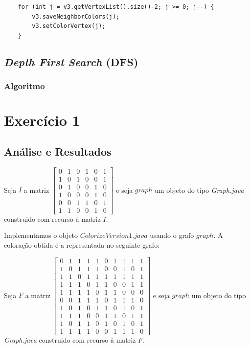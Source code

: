 \documentclass[a4paper,12pt]{report}
\begin{document}
\begin{lstlisting}
    for (int j = v3.getVertexList().size()-2; j >= 0; j--) {
        v3.saveNeighborColors(j);
        v3.setColorVertex(j);
    }
\end{lstlisting}

\section{\textit{Depth First Search} (DFS)}

\subsection{Algoritmo}

\chapter{Exercício 1}

\section{Análise e Resultados}

Seja $I$ a matriz 
$\begin{bmatrix}
    0&1&0&1&0&1\\
    1&0&1&0&0&1\\
    0&1&0&0&1&0\\
    1&0&0&0&1&0\\
    0&0&1&1&0&1\\
    1&1&0&0&1&0
\end{bmatrix}$ e seja $graph$ um objeto do tipo \textit{Graph.java} construido com recurso à matriz $I$.

Implementamos o objeto $ColorizeVersion1.java$ usando o grafo $graph$.
A coloração obtida é a representada no seguinte grafo:



Seja $F$ a matriz 
$\begin{bmatrix}
    0&1&1&1&1&0&1&1&1&1\\
    1&0&1&1&1&0&0&1&0&1\\
    1&1&0&1&1&1&1&1&1&1\\
    1&1&1&0&1&1&0&0&1&1\\
    1&1&1&1&0&1&1&0&0&0\\
    0&0&1&1&1&0&1&1&1&0\\
    1&0&1&0&1&1&0&1&0&1\\
    1&1&1&0&0&1&1&0&1&1\\
    1&0&1&1&0&1&0&1&0&1\\
    1&1&1&1&0&0&1&1&1&0
\end{bmatrix}$ e seja $graph$ um objeto do tipo \textit{Graph.java} construido com recurso à matriz $F$.
\end{document}
